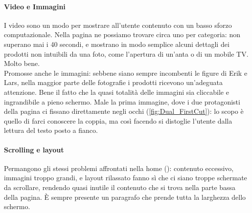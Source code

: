 \paragraph*{Video e Immagini}
I video sono un modo per mostrare all'utente contenuto con un basso sforzo computazionale. Nella pagina ne possiamo trovare circa uno per categoria: non superano mai i 40 secondi, e mostrano in modo semplice alcuni dettagli dei prodotti non intuibili da una foto, come l'apertura di un'anta o di un mobile TV. Molto bene.\\
Promosse anche le immagini: sebbene siano sempre incombenti le figure di Erik e Lars, nella maggior parte delle fotografie i prodotti ricevono un'adeguata attenzione. Bene il fatto che la quasi totalità delle immagini sia cliccabile e ingrandibile a pieno schermo. Male la prima immagine, dove i due protagonisti della pagina ci fissano direttamente negli occhi (\autoref{fig:Dual_FirstCut}): lo scopo è quello di farci conoscere la coppia, ma così facendo si distoglie l'utente dalla lettura del testo posto a fianco.

\paragraph*{Scrolling e layout}
\label{sez:DualHome_Scrolling}
Permangono gli stessi problemi affrontati nella home (): contenuto eccessivo, immagini troppo grandi, e layout rilassato fanno sì che ci siano troppe schermate da scrollare, rendendo quasi inutile il contenuto che si trova nella parte bassa della pagina.
\`E sempre presente un paragrafo che prende tutta la larghezza dello schermo.